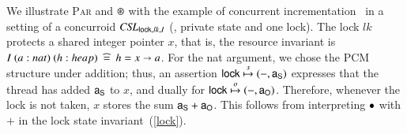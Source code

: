 We illustrate \textsc{Par} and $\circledast$ with the example of concurrent
incrementation~\cite{Owicki-Gries:CACM76,LeyWild-Nanevski:POPL13} in a
setting of a concurroid $\textit{CSL}_{\mathsf{lock},lk,I}$ (\ie, private state and
one lock).  The lock $lk$ protects a shared integer pointer $x$, that
is, the resource invariant is $I\ (a:nat)\ (h : heap) \eqdef h = x
\hpts a$.  For the nat argument, we chose the PCM structure under
addition; thus, an assertion $\mathsf{lock} \mathrel{\overset{s}{\mapsto}} (-, \mathsf{a}_{{\mathsf{S}}})$ expresses that
the \self thread has added $\mathsf{a}_{{\mathsf{S}}}$ to $x$, and dually for $\mathsf{lock} \mathrel{\overset{o}{\mapsto}}
(-, \mathsf{a}_{{\mathsf{O}}})$. Therefore, whenever the lock is not taken, $x$ stores the
sum $\mathsf{a}_{{\mathsf{S}}} + \mathsf{a}_{{\mathsf{O}}}$. This follows from interpreting $\bullet$ with $+$ in
the lock state invariant~(\ref{lock}).


